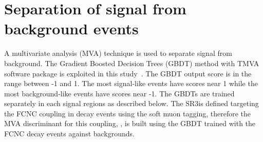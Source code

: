 %
%


\section{Separation of signal from background events}
\label{sec:separation}
A multivariate analysis (MVA) technique is used to separate signal from background. 
The Gradient Boosted Decision Trees (GBDT) method with TMVA software package 
is exploited in this study~\cite{BDTG,TMVA}. The GBDT output score is in the range between -1 and 1.
The most signal-like events have scores near 1 while the most background-like events have scores near -1. The GBDTs are trained separately in each signal regions as described below.
The SR3\tZc is defined targeting the FCNC \tZc coupling in \ttbar decay events
using the soft muon tagging, therefore the MVA discriminant for this coupling, \Dthree, is built using the GBDT trained with the FCNC \tZc \ttbar decay events against backgrounds.

